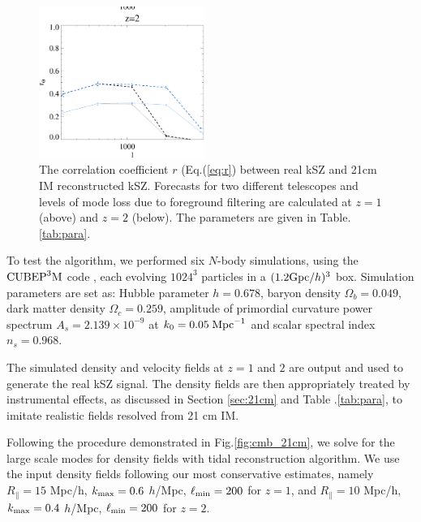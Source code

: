 \begin{figure}[tbp]
\begin{center}
\includegraphics[width=0.48\textwidth]{figure/cl_correlation_z1_z2.eps}
\end{center}
\vspace{-0.7cm}
\caption{The correlation coefficient $r$ (Eq.(\ref{eq:r}) between real kSZ  
and 21cm IM reconstructed kSZ. Forecasts for two different telescopes and levels of mode loss due to foreground filtering are calculated at $z=1$ (above) and $z=2$ (below). The parameters are given in Table.\ref{tab:para}. 
}
\label{fig:r}
\end{figure}
\label{ssec:tide}

To test the algorithm, we performed six $N$-body simulations, using the $\mathrm{CUBEP}^3\mathrm{M}$ code \cite{2013:code}, each evolving $1024^3$ particles in a $(1.2\mathrm{Gpc}/h)^3$ box. Simulation parameters are set as: Hubble parameter $h=0.678$, baryon density $\Omega_{b}=0.049$, dark matter density $\Omega_{c}=0.259$, amplitude of primordial curvature power spectrum $A_s=2.139\times10^{-9}$ at $k_0=0.05\;\mathrm{Mpc}^{-1}$ and scalar spectral index $n_s=0.968$.

The simulated density and velocity fields at $z=1$ and $2$ are output 
and used to generate the real kSZ signal. 
The density fields are then appropriately treated by instrumental effects, as discussed in Section \ref{sec:21cm} and Table .\ref{tab:para}, to imitate realistic fields resolved from 21 cm IM. 

Following the procedure demonstrated in Fig.\ref{fig:cmb_21cm}, 
we solve for the large scale modes for density fields with tidal reconstruction algorithm. 
We use the input density fields following our most conservative estimates, namely $R_\parallel=15$ Mpc/h, $k_\mathrm{max}=0.6$ $h$/Mpc, $\ell_\mathrm{min}=200$ for $z=1$, and $R_\parallel=10$ Mpc/h, $k_\mathrm{max}=0.4$ $h$/Mpc, $\ell_\mathrm{min}=200$ for $z=2$. 


